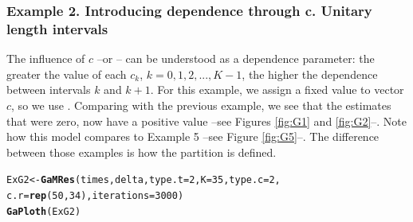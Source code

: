 \documentclass[letterpaper]{article}\usepackage[]{graphicx}\usepackage[]{color}
\makeatletter
\newcommand{\hlnum}[1]{\textcolor[rgb]{0.686,0.059,0.569}{#1}}%
\newcommand{\hlstd}[1]{\textcolor[rgb]{0.345,0.345,0.345}{#1}}%
\newcommand{\hlkwb}[1]{\textcolor[rgb]{0.69,0.353,0.396}{#1}}%
\newcommand{\hlkwc}[1]{\textcolor[rgb]{0.333,0.667,0.333}{#1}}%
\newcommand{\hlkwd}[1]{\textcolor[rgb]{0.737,0.353,0.396}{\textbf{#1}}}%
\newenvironment{kframe}{%
 \def\at@end@of@kframe{}%
 \ifinner\ifhmode%
  \def\at@end@of@kframe{\end{minipage}}%
  \begin{minipage}{\columnwidth}%
 \fi\fi%
 \def\FrameCommand##1{\hskip\@totalleftmargin \hskip-\fboxsep
 \colorbox{shadecolor}{##1}\hskip-\fboxsep
     \hskip-\linewidth \hskip-\@totalleftmargin \hskip\columnwidth}%
 \MakeFramed {\advance\hsize-\width
   \@totalleftmargin\z@ \linewidth\hsize
   \@setminipage}}%
 {\par\unskip\endMakeFramed%
 \at@end@of@kframe}
\newenvironment{knitrout}{}{} %
\makeatother
\begin{document}
\subsubsection{Example 2. Introducing dependence through c. Unitary length intervals}

The influence of $c$ --or -- can be understood as a dependence parameter: the greater the value of each $c_k$, $k=0,1,2,...,K-1$, the higher the dependence between intervals $k$ and $k+1$. For this example, we assign a fixed value to vector $c$, so we use . Comparing with the previous example, we see that the estimates that were zero, now have a positive value --see Figures \ref{fig:G1} and \ref{fig:G2}--. Note  how this model compares to Example 5 --see Figure \ref{fig:G5}--. The difference between those examples is how the partition is defined.

\begin{knitrout}
\color{fgcolor}\begin{kframe}
\begin{alltt}
\hlstd{ExG2} \hlkwb{<-} \hlkwd{GaMRes}\hlstd{(times, delta,} \hlkwc{type.t} \hlstd{=} \hlnum{2}\hlstd{,} \hlkwc{K} \hlstd{=} \hlnum{35}\hlstd{,} \hlkwc{type.c} \hlstd{=} \hlnum{2}\hlstd{,}
               \hlkwc{c.r} \hlstd{=} \hlkwd{rep}\hlstd{(}\hlnum{50}\hlstd{,} \hlnum{34}\hlstd{),} \hlkwc{iterations} \hlstd{=} \hlnum{3000}\hlstd{)}
\hlkwd{GaPloth}\hlstd{(ExG2)}
\end{alltt}
\end{kframe}
\end{knitrout}
\end{document}
